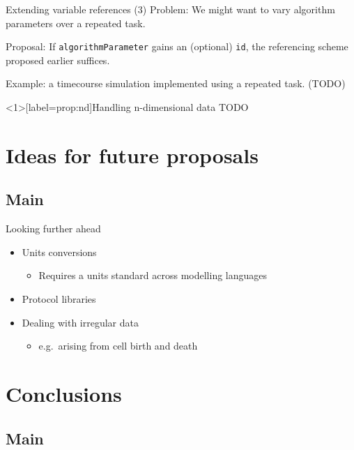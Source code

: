 \documentclass[t,xcolor={usenames,dvipsnames}]{beamer}
\newcommand{\sedml}[1]{\lstinline[basicstyle=\color{blue}]!#1!}
\newcommand{\subitem}[1]{\begin{itemize}[<.->]\item #1 \end{itemize}}
\begin{document}
\begin{frame}{Extending variable references (3)}
\alert{Problem}:
 We might want to vary algorithm parameters over a repeated task.

\alert{Proposal}:
 If \sedml{algorithmParameter} gains an (optional) \sedml{id}, the
 referencing scheme proposed earlier suffices.

Example: a timecourse simulation implemented using a repeated task.
(TODO)
\end{frame}


\begin{frame}<1>[label=prop:nd]{Handling n-dimensional data}
TODO
\end{frame}


\section{Ideas for future proposals}
\subsection*{Main}

\begin{frame}{Looking further ahead}
\begin{itemize}[<+->]
\item Units conversions
  \subitem{Requires a units standard across modelling languages}
\item Protocol libraries
\item Dealing with irregular data
  \subitem{e.g.\ arising from cell birth and death}
\end{itemize}
\end{frame}


\section{Conclusions}
\subsection*{Main}
\end{document}
